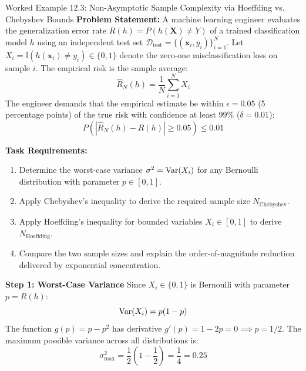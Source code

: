 \begin{examplebox}[breakable]{Worked Example 12.3: Non-Asymptotic Sample Complexity via Hoeffding vs. Chebyshev Bounds}
\textbf{Problem Statement:}
A machine learning engineer evaluates the generalization error rate $R(h) = P(h(\mathbf{X}) \ne Y)$ of a trained classification model $h$ using an independent test set $\mathcal{D}_{\text{test}} = \{(\mathbf{x}_i, y_i)\}_{i=1}^N$.
Let $X_i = \mathbb{I}(h(\mathbf{x}_i) \ne y_i) \in \{0, 1\}$ denote the zero-one misclassification loss on sample $i$. The empirical risk is the sample average:
\begin{equation}
\hat{R}_N(h) = \frac{1}{N} \sum_{i=1}^N X_i
\end{equation}
The engineer demands that the empirical estimate be within $\epsilon = 0.05$ (5 percentage points) of the true risk with confidence at least $99\%$ ($\delta = 0.01$):
\begin{equation}
P\left( |\hat{R}_N(h) - R(h)| \ge 0.05 \right) \le 0.01
\end{equation}

\textbf{Task Requirements:}
\begin{enumerate}
    \item Determine the worst-case variance $\sigma^2 = \operatorname{Var}(X_i)$ for any Bernoulli distribution with parameter $p \in [0, 1]$.
    \item Apply Chebyshev's inequality to derive the required sample size $N_{\text{Chebyshev}}$.
    \item Apply Hoeffding's inequality for bounded variables $X_i \in [0, 1]$ to derive $N_{\text{Hoeffding}}$.
    \item Compare the two sample sizes and explain the order-of-magnitude reduction delivered by exponential concentration.
\end{enumerate}

\tcblower

\textbf{Step 1: Worst-Case Variance}
Since $X_i \in \{0, 1\}$ is Bernoulli with parameter $p = R(h)$:
\begin{equation}
\operatorname{Var}(X_i) = p(1 - p)
\end{equation}
The function $g(p) = p - p^2$ has derivative $g'(p) = 1 - 2p = 0 \implies p = 1/2$. The maximum possible variance across all distributions is:
\begin{equation}
\sigma_{\max}^2 = \frac{1}{2}\left(1 - \frac{1}{2}\right) = \frac{1}{4} = 0.25
\end{equation}


\end{examplebox}
